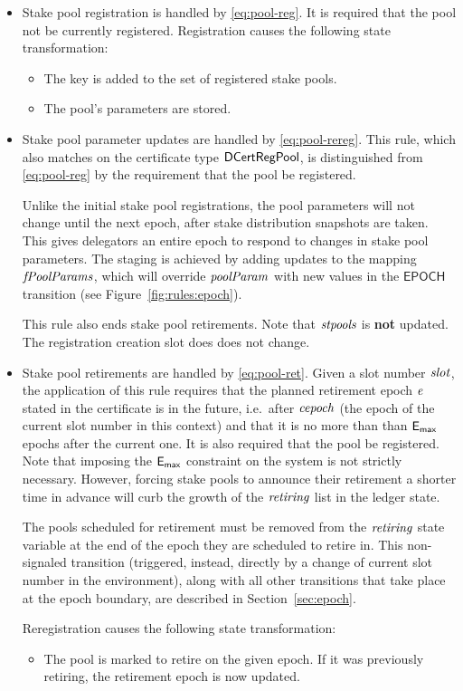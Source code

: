 \begin{itemize}
  \item Stake pool registration is handled by \cref{eq:pool-reg}.
    It is required that the pool not be currently registered.
    Registration causes the following state transformation:
    \begin{itemize}
      \item The key is added to the set of registered stake pools.
      \item The pool's parameters are stored.
    \end{itemize}
  \item Stake pool parameter updates are handled by \cref{eq:pool-rereg}.
    This rule, which also matches on the certificate type $\mathsf{DCertRegPool}$,
    is distinguished from \cref{eq:pool-reg} by the requirement that the pool be registered.

    Unlike the initial stake pool registrations, the pool parameters will not change
    until the next epoch, after stake distribution snapshots are taken.
    This gives delegators an entire epoch to respond to changes in stake pool parameters.
    The staging is achieved by adding updates to the mapping $\mathit{fPoolParams}$,
    which will override $\mathit{poolParam}$ with new values in the $\mathsf{EPOCH}$ transition
    (see Figure~\cref{fig:rules:epoch}).

    This rule also ends stake pool retirements.
    Note that $\mathit{stpools}$ is \textbf{not} updated.
    The registration creation slot does does not change.
  \item Stake pool retirements are handled by \cref{eq:pool-ret}.
    Given a slot number $\mathit{slot}$, the application of this rule requires that the
    planned retirement epoch $\mathit{e}$ stated in the certificate is in the future,
    i.e.~after $\mathit{cepoch}$ (the epoch of the current slot number in this context) and
    that it is no more than than $\mathsf{E_{max}}$ epochs after the current one.
    It is also required that the pool be registered.
    Note that imposing the $\mathsf{E_{max}}$ constraint on the system is not strictly necessary.
    However, forcing stake pools to announce their retirement a shorter time in
    advance will curb the growth of the $\mathit{retiring}$ list in the ledger state.

    The pools scheduled for retirement must be removed from
    the $\mathit{retiring}$ state variable at the end of the epoch they are scheduled
    to retire in. This non-signaled transition (triggered, instead, directly by a
    change of current slot number in the environment), along with all other transitions
    that take place at the epoch boundary, are described in Section~\ref{sec:epoch}.

    Reregistration causes the following state transformation:
    \begin{itemize}
      \item The pool is marked to retire on the given epoch.
        If it was previously retiring, the retirement epoch is now updated.
    \end{itemize}
\end{itemize}

